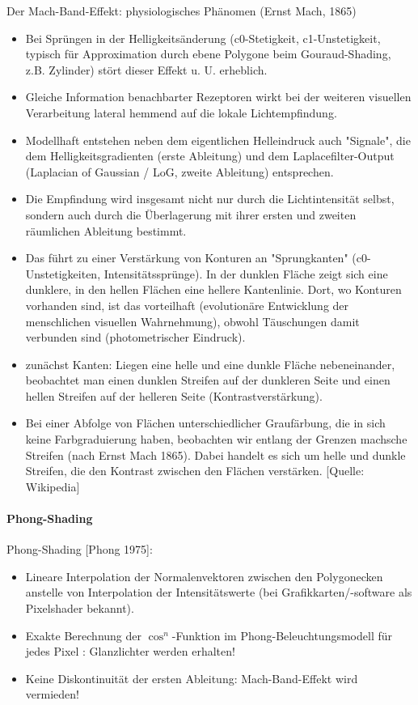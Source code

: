 \documentclass[10pt,landscape]{article}
\begin{document}
\begin{multicols}{3}
{  Der Mach-Band-Effekt: physiologisches Phänomen (Ernst Mach, 1865)
  \begin{itemize}
    \item Bei Sprüngen in der Helligkeitsänderung (c0-Stetigkeit, c1-Unstetigkeit, typisch für Approximation durch ebene Polygone beim Gouraud-Shading, z.B. Zylinder) stört dieser Effekt u. U. erheblich.
    \item Gleiche Information benachbarter Rezeptoren wirkt bei der weiteren visuellen Verarbeitung lateral hemmend auf die lokale Lichtempfindung.
    \item Modellhaft entstehen neben dem eigentlichen Helleindruck auch "Signale", die dem Helligkeitsgradienten (erste Ableitung) und dem Laplacefilter-Output (Laplacian of Gaussian / LoG, zweite Ableitung) entsprechen.
    \item Die Empfindung wird insgesamt nicht nur durch die Lichtintensität selbst, sondern auch durch die Überlagerung mit ihrer ersten und zweiten räumlichen Ableitung bestimmt.
    \item Das führt zu einer Verstärkung von Konturen an "Sprungkanten" (c0-Unstetigkeiten, Intensitätssprünge). In der dunklen Fläche zeigt sich eine dunklere, in den hellen Flächen eine hellere Kantenlinie. Dort, wo Konturen vorhanden sind, ist das vorteilhaft (evolutionäre Entwicklung der menschlichen visuellen Wahrnehmung), obwohl Täuschungen damit verbunden sind (photometrischer Eindruck).
    \item zunächst Kanten: Liegen eine helle und eine dunkle Fläche nebeneinander, beobachtet man einen dunklen Streifen auf der dunkleren Seite und einen hellen Streifen auf der helleren Seite (Kontrastverstärkung).
    \item Bei einer Abfolge von Flächen unterschiedlicher Graufärbung, die in sich keine Farbgraduierung haben, beobachten wir entlang der Grenzen machsche Streifen (nach Ernst Mach 1865). Dabei handelt es sich um helle und dunkle Streifen, die den Kontrast zwischen den Flächen verstärken. [Quelle: Wikipedia]
  \end{itemize}
  
  \paragraph{Phong-Shading}
  Phong-Shading [Phong 1975]:
  \begin{itemize}
    \item Lineare Interpolation der Normalenvektoren zwischen den Polygonecken anstelle von Interpolation der Intensitätswerte (bei Grafikkarten/-software als Pixelshader bekannt).
    \item Exakte Berechnung der $\cos^n$-Funktion im Phong-Beleuchtungsmodell für jedes Pixel : Glanzlichter werden erhalten!
    \item Keine Diskontinuität der ersten Ableitung: Mach-Band-Effekt wird vermieden!
  \end{itemize}
  
}
\end{multicols}
\end{document}
